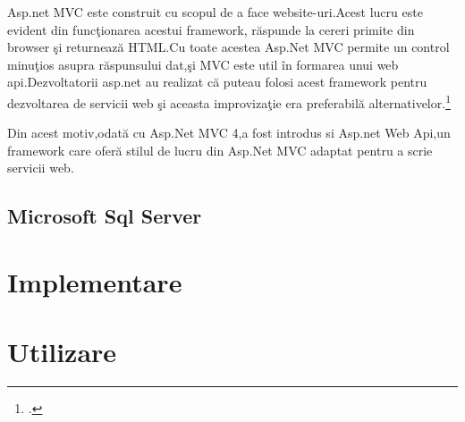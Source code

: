 \documentclass[a4paper,12pt]{report}
\begin{document}
Asp.net MVC este construit cu scopul de a face website-uri.Acest lucru este evident din func\c tionarea acestui framework,
r\u aspunde la cereri primite din browser \c si returneaz\u a HTML.Cu toate acestea Asp.Net MVC permite un control minu\c tios
asupra r\u aspunsului dat,\c si MVC este util \^in formarea unui web api.Dezvoltatorii asp.net au realizat c\u a puteau folosi
acest framework pentru dezvoltarea de servicii web \c si aceasta improviza\c tie era preferabil\u a alternativelor.\footcite{proAspNetMVC5Asp}

Din acest motiv,odat\u a cu Asp.Net MVC 4,a fost introdus si Asp.net Web Api,un framework care ofer\u a 
stilul de lucru din Asp.Net MVC adaptat pentru a scrie servicii web.



\section{Microsoft Sql Server}
\chapter{Implementare}

\chapter{Utilizare}

\printbibliography
\end{document}
